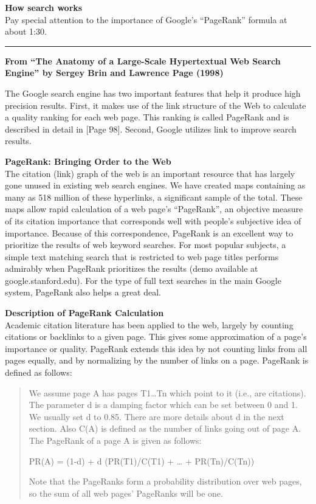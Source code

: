\documentclass[]{book}
\theoremstyle{definition}
\theoremstyle{definition}
\theoremstyle{definition}
\theoremstyle{remark}
\begin{document}
\textbf{How search works}\\
Pay special attention to the importance of Google's ``PageRank'' formula
at about 1:30.

\begin{center}\rule{0.5\linewidth}{\linethickness}\end{center}

\textbf{From ``The Anatomy of a Large-Scale Hypertextual Web Search
Engine'' by Sergey Brin and Lawrence Page (1998)}

The Google search engine has two important features that help it produce
high precision results. First, it makes use of the link structure of the
Web to calculate a quality ranking for each web page. This ranking is
called PageRank and is described in detail in {[}Page 98{]}. Second,
Google utilizes link to improve search results.

\textbf{PageRank: Bringing Order to the Web}\\
The citation (link) graph of the web is an important resource that has
largely gone unused in existing web search engines. We have created maps
containing as many as 518 million of these hyperlinks, a significant
sample of the total. These maps allow rapid calculation of a web page's
``PageRank'', an objective measure of its citation importance that
corresponds well with people's subjective idea of importance. Because of
this correspondence, PageRank is an excellent way to prioritize the
results of web keyword searches. For most popular subjects, a simple
text matching search that is restricted to web page titles performs
admirably when PageRank prioritizes the results (demo available at
google.stanford.edu). For the type of full text searches in the main
Google system, PageRank also helps a great deal.

\textbf{Description of PageRank Calculation}\\
Academic citation literature has been applied to the web, largely by
counting citations or backlinks to a given page. This gives some
approximation of a page's importance or quality. PageRank extends this
idea by not counting links from all pages equally, and by normalizing by
the number of links on a page. PageRank is defined as follows:

\begin{quote}
We assume page A has pages T1\ldots{}Tn which point to it (i.e., are
citations). The parameter d is a damping factor which can be set between
0 and 1. We usually set d to 0.85. There are more details about d in the
next section. Also C(A) is defined as the number of links going out of
page A. The PageRank of a page A is given as follows:

PR(A) = (1-d) + d (PR(T1)/C(T1) + \ldots{} + PR(Tn)/C(Tn))

Note that the PageRanks form a probability distribution over web pages,
so the sum of all web pages' PageRanks will be one.
\end{quote}
\end{document}
